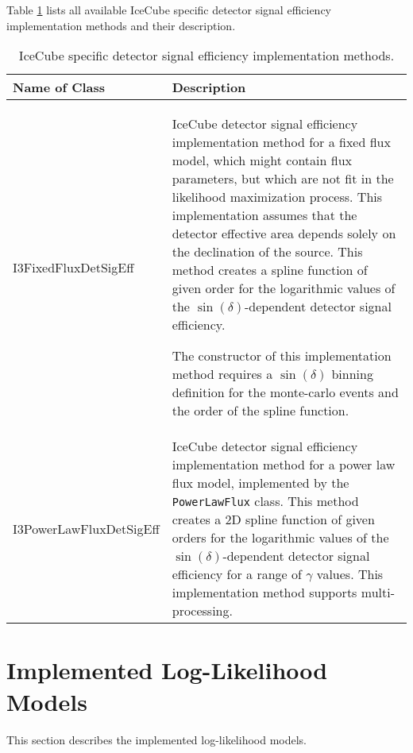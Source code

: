 \documentclass{article}
\newcommand{\code}[1]{\texttt{#1}}
\newcommand{\class}[1]{\colorbox{blue!30}{\code{#1}}}
\begin{document}
Table \ref{tbl:I3DetSigEffImplMethod} lists all available IceCube specific
detector signal efficiency implementation methods and their description.
\begin{table}
\caption{IceCube specific detector signal efficiency implementation methods.}
\label{tbl:I3DetSigEffImplMethod}

\begin{tabular}{l | p{10cm}}
\hline
Name of Class & Description \\
\hline
I3FixedFluxDetSigEff & IceCube detector signal efficiency implementation method for a
    fixed flux model, which might contain flux parameters, but which
    are not fit in the likelihood maximization process.
    This implementation assumes that the detector effective
    area depends solely on the declination of the source. This method creates
    a spline function of given order for the logarithmic values of the
    $\sin(\delta)$-dependent detector signal efficiency.

    The constructor of this implementation method requires a $\sin(\delta)$
    binning definition for the monte-carlo events and the order of the spline
    function.\\
I3PowerLawFluxDetSigEff & IceCube detector signal efficiency implementation method for a
    power law flux model, implemented by the \class{PowerLawFlux} class.
    This method creates a 2D spline function of given orders for the logarithmic
    values of the $\sin(\delta)$-dependent detector signal efficiency for a
    range of $\gamma$ values. This implementation method supports
    multi-processing.
\end{tabular}
\end{table}



\section{Implemented Log-Likelihood Models}
This section describes the implemented log-likelihood models. \cite{TimeDepPSSearchMethods2010}

%
%



\end{document}
